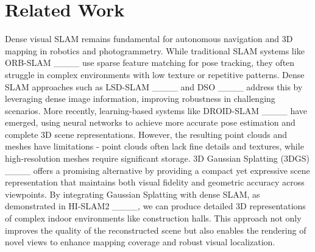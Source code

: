 \section{Related Work}
\label{RelatedWork}
Dense visual SLAM remains fundamental for autonomous navigation and 3D mapping in robotics and photogrammetry. While traditional SLAM systems like ORB-SLAM ____ use sparse feature matching for pose tracking, they often struggle in complex environments with low texture or repetitive patterns. Dense SLAM approaches such as LSD-SLAM ____ and DSO ____ address this by leveraging dense image information, improving robustness in challenging scenarios. More recently, learning-based systems like DROID-SLAM ____ have emerged, using neural networks to achieve more accurate pose estimation and complete 3D scene representations. However, the resulting point clouds and meshes have limitations - point clouds often lack fine details and textures, while high-resolution meshes require significant storage. 3D Gaussian Splatting (3DGS) ____ offers a promising alternative by providing a compact yet expressive scene representation that maintains both visual fidelity and geometric accuracy across viewpoints. By integrating Gaussian Splatting with dense SLAM, as demonstrated in HI-SLAM2 ____, we can produce detailed 3D representations of complex indoor environments like construction halls. This approach not only improves the quality of the reconstructed scene but also enables the rendering of novel views to enhance mapping coverage and robust visual localization.